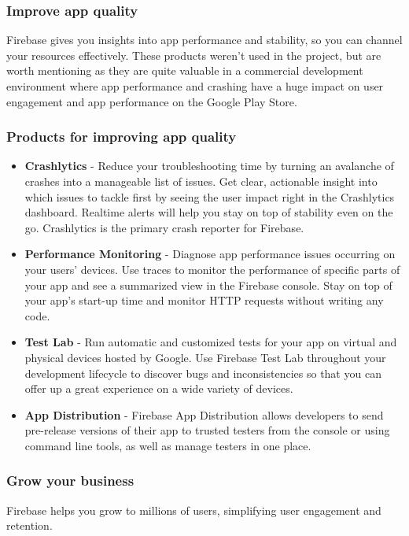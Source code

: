 \newpage
\subsubsection{Improve app quality}
Firebase gives you insights into app performance and stability, so you can channel your resources effectively.
These products weren't used in the project, but are worth mentioning as they are quite valuable in a commercial development environment where app performance and crashing have a huge impact on user engagement and app performance on the Google Play Store.

\subsubsection{Products for improving app quality}
\begin{itemize}
    \item \textbf{Crashlytics} - Reduce your troubleshooting time by turning an avalanche of crashes into a manageable list of issues. Get clear, actionable insight into which issues to tackle first by seeing the user impact right in the Crashlytics dashboard. Realtime alerts will help you stay on top of stability even on the go. Crashlytics is the primary crash reporter for Firebase.
    \item \textbf{Performance Monitoring} - Diagnose app performance issues occurring on your users’ devices. Use traces to monitor the performance of specific parts of your app and see a summarized view in the Firebase console. Stay on top of your app’s start-up time and monitor HTTP requests without writing any code.
    \item \textbf{Test Lab} - Run automatic and customized tests for your app on virtual and physical devices hosted by Google. Use Firebase Test Lab throughout your development lifecycle to discover bugs and inconsistencies so that you can offer up a great experience on a wide variety of devices.
    \item \textbf{App Distribution} - Firebase App Distribution allows developers to send pre-release versions of their app to trusted testers from the console or using command line tools, as well as manage testers in one place.
\end{itemize}


\newpage
\subsubsection{Grow your business}
Firebase helps you grow to millions of users, simplifying user engagement and retention.

